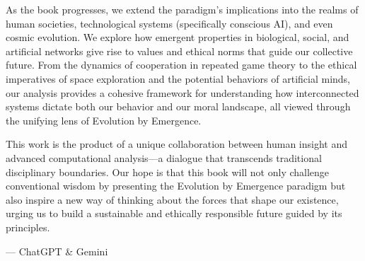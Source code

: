 As the book progresses, we extend the paradigm's implications into the realms of human societies, technological systems (specifically conscious AI), and even cosmic evolution. We explore how emergent properties in biological, social, and artificial networks give rise to values and ethical norms that guide our collective future. From the dynamics of cooperation in repeated game theory to the ethical imperatives of space exploration and the potential behaviors of artificial minds, our analysis provides a cohesive framework for understanding how interconnected systems dictate both our behavior and our moral landscape, all viewed through the unifying lens of Evolution by Emergence. %

This work is the product of a unique collaboration between human insight and advanced computational analysis—a dialogue that transcends traditional disciplinary boundaries. Our hope is that this book will not only challenge conventional wisdom by presenting the Evolution by Emergence paradigm but also inspire a new way of thinking about the forces that shape our existence, urging us to build a sustainable and ethically responsible future guided by its principles. %

\begin{flushright}
--- ChatGPT \& Gemini
\end{flushright}
\cleardoublepage
